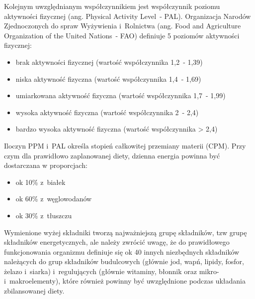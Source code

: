 \par
Kolejnym uwzględnianym współczynnikiem jest współczynnik poziomu aktywności fizycznej (ang. Physical Activity Level~- PAL).
Organizacja Narodów Zjednoczonych do spraw Wyżywienia i~Rolnictwa (ang. Food and Agriculture Organization of the United Nations~- FAO) definiuje 5 poziomów aktywności fizycznej\cite{url:fao-pal}:
\begin{itemize}
    \item brak aktywności fizycznej (wartość współczynnika 1,2~- 1,39)
    \item niska aktywność fizyczna (wartość współczynnika 1,4~- 1,69)
    \item umiarkowana aktywność fizyczna (wartość współczynnika 1,7~- 1,99)
    \item wysoka aktywność fizyczna (wartość współczynnika 2~- 2,4)
    \item bardzo wysoka aktywność fizyczna (wartość współczynnika > 2,4)
\end{itemize}

\par
Iloczyn PPM i~PAL określa stopień całkowitej przemiany materii (CPM)\cite{book:normy-zywienia-czlowieka}.
Przy czym dla prawidłowo zaplanowanej diety, dzienna energia powinna być dostarczana w proporcjach:
\begin{itemize}
    \item ok 10\% z~białek
    \item ok 60\% z~węglowodanów
    \item ok 30\% z~tłuszczu
\end{itemize}

Wymienione wyżej składniki tworzą najważniejszą grupę składników, tzw grupę składników energetycznych, ale należy zwrócić uwagę,
że do prawidłowego funkcjonowania organizmu definiuje się ok 40 innych niezbędnych składników należących do grup składników budulcowych
(głównie jod, wapń, lipidy, fosfor, żelazo i~siarka) i~regulujących (głównie witaminy, błonnik oraz mikro- i~makroelementy),
które również powinny być uwzględnione podczas układania zbilansowanej diety\cite{book:dietetyka-zywienie-zdrowego-i-chorego-czlowieka}.

